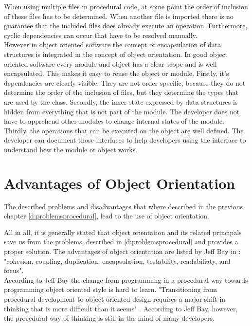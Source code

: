 When using multiple files in procedural code, at some point the order of inclusion of these files has to be determined. When another file is imported there is no guarantee that the included files does already execute an operation. Furthermore, cyclic dependencies can occur that have to be resolved manually. \\

However in object oriented software the concept of encapsulation of data structures is integrated in the concept of object orientation.  In good object oriented software every module and object has a clear scope and is well encapsulated. This makes it easy to reuse the object or module. Firstly, it's dependencies are clearly visible. They are not order specific, because they do not determine the order of the inclusion of files, but they determine the types that are used by the class. Secondly, the inner state expressed by data structures is hidden from everything that is not part of the module. The developer does not have to apprehend other modules to change internal states of the module. Thirdly, the operations that can be executed on the object are well defined. The developer can document those interfaces to help developers using the interface to understand how the module or object works.

\section{Advantages of Object Orientation}
The described problems and disadvantages that where described in the previous chapter \ref{d:problemsprocedural}, lead to the use of object orientation. 

All in all, it is generally stated that object orientation and its related principals save us from the problems, described in \ref{d:problemsprocedural} and provides a proper solution. The advantages of object orientation are listed by Jeff Bay in \cite[p. 70]{oc2008}: "cohesion, coupling, duplication, encapsulation, testability, readabiliaty, and focus".
\\

According to Jeff Bay the change from programming in a procedural way towards programming object oriented style is hard to learn. "Transitioning from procedural development to object-oriented design requires a major shift in thinking that is more difficult than it seems" \cite[p. 70]{bay2008}. 
According to Jeff Bay, however, the procedural way of thinking is still in the mind of many developers.

